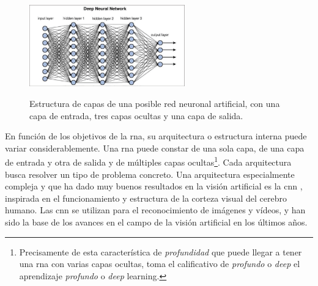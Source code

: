 
\begin{figure}[H]
    \caption[Estructura de capas de una posible red neuronal artificial]{Estructura de capas de una posible red neuronal artificial, con una capa de entrada, tres capas ocultas y una capa de salida.}
    \centering
    \includegraphics[width=0.6\textwidth]{./figuras/Deep_neural_network.png}
    \label{fig:deep_neural_network}
\end{figure}

En función de los objetivos de la \gls{rna}, su arquitectura o estructura interna puede variar considerablemente. Una \gls{rna} puede constar de una sola capa, de una capa de entrada y otra de salida y de múltiples capas ocultas\footnote{Precisamente de esta característica de \emph{profundidad} que puede llegar a tener una \gls{rna} con varias capas ocultas, toma el calificativo de \emph{profundo} o \emph{deep} el aprendizaje \emph{profundo} o \emph{deep} learning.}. Cada arquitectura busca resolver un tipo de problema concreto. Una arquitectura especialmente compleja y que ha dado muy buenos resultados en la visión artificial es la \gls{cnn} \citep{osheaIntroductionConvolutionalNeural2015}, inspirada en el funcionamiento y estructura de la corteza visual del cerebro humano. Las \gls{cnn} se utilizan para el reconocimiento de imágenes y vídeos, y han sido la base de los avances en el campo de la visión artificial en los últimos años.

